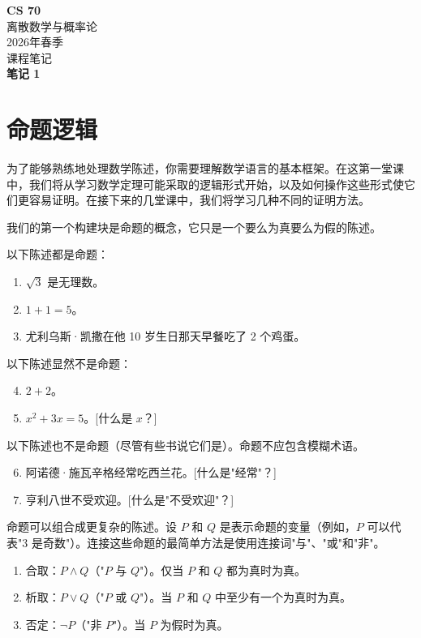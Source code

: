\documentclass[11pt]{article}
\begin{document}
\begin{center}
{\Large\bfseries CS 70}\\[0.2em]
离散数学与概率论\\[0.1em]
2026年春季\\[0.1em]
课程笔记\\[0.3em]
\textbf{笔记 1}
\end{center}

\section{命题逻辑}

为了能够熟练地处理数学陈述，你需要理解数学语言的基本框架。在这第一堂课中，我们将从学习数学定理可能采取的逻辑形式开始，以及如何操作这些形式使它们更容易证明。在接下来的几堂课中，我们将学习几种不同的证明方法。

我们的第一个构建块是命题的概念，它只是一个要么为真要么为假的陈述。

以下陈述都是命题：
\begin{enumerate}
\item $\sqrt{3}$ 是无理数。
\item $1 + 1 = 5$。
\item 尤利乌斯·凯撒在他 10 岁生日那天早餐吃了 2 个鸡蛋。
\end{enumerate}

以下陈述显然不是命题：
\begin{enumerate}
\setcounter{enumi}{3}
\item $2 + 2$。
\item $x^2 + 3x = 5$。[什么是 $x$？]
\end{enumerate}

以下陈述也不是命题（尽管有些书说它们是）。命题不应包含模糊术语。
\begin{enumerate}
\setcounter{enumi}{5}
\item 阿诺德·施瓦辛格经常吃西兰花。[什么是"经常"？]
\item 亨利八世不受欢迎。[什么是"不受欢迎"？]
\end{enumerate}

命题可以组合成更复杂的陈述。设 $P$ 和 $Q$ 是表示命题的变量（例如，$P$ 可以代表"3 是奇数"）。连接这些命题的最简单方法是使用连接词"与"、"或"和"非"。

\begin{enumerate}
\item 合取：$P \land Q$（"$P$ 与 $Q$"）。仅当 $P$ 和 $Q$ 都为真时为真。
\item 析取：$P \lor Q$（"$P$ 或 $Q$"）。当 $P$ 和 $Q$ 中至少有一个为真时为真。
\item 否定：$\neg P$（"非 $P$"）。当 $P$ 为假时为真。
\end{enumerate}
\end{document}
